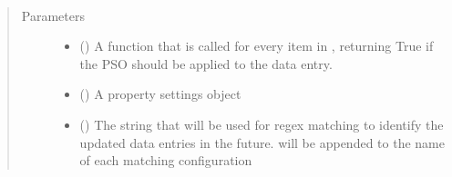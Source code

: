 \documentclass[letterpaper,10pt,english]{sphinxmanual}
\begin{document}
\begin{fulllineitems}
\begin{fulllineitems}
\begin{quote}
\begin{description}
\begin{itemize}
\end{itemize}

\end{description}\end{quote}

\end{fulllineitems}


\begin{fulllineitems}
\label{\detokenize{dataset:colabfit.tools.dataset.Dataset.attach_property_settings}}~\begin{quote}\begin{description}
\item[{Parameters}] \leavevmode\begin{itemize}
\item {} 
\sphinxAtStartPar
{} () \textendash{} A function that is called for every item in ,
returning True if the PSO should be applied to the data entry.

\item {} 
\sphinxAtStartPar
{} ({\hyperref[\detokenize{property_settings:colabfit.tools.property_settings.PropertySettings}]{}}) \textendash{} A property settings object

\item {} 
\sphinxAtStartPar
{} () \textendash{} The string that will be used for regex matching to identify
the updated data entries in the future.  will be
appended to the name of each matching configuration

\end{itemize}

\end{description}\end{quote}

\end{fulllineitems}



\end{fulllineitems}
\end{document}
